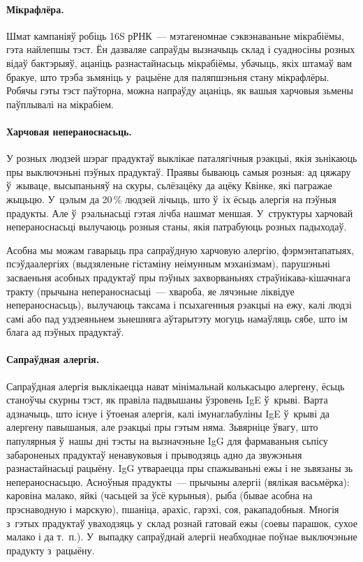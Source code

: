 \paragraph{Мікрафлёра.}
Шмат кампаніяў робіць 16S рРНК~--- мэтагеномнае сэквэнаваньне мікрабіёмы, гэта найлепшы тэст. Ён дазваляе сапраўды вызначыць склад і суадносіны розных відаў бактэрыяў, ацаніць разнастайнасьць мікрабіёмы, убачыць, якіх штамаў вам бракуе, што трэба зьмяніць у~рацыёне для паляпшэньня стану мікрафлёры. Робячы гэты тэст паўторна, можна напраўду ацаніць, як вашыя харчовыя зьмены паўплывалі на мікрабіем.

\paragraph{Харчовая непераноснасьць.}
У розных людзей шэраг прадуктаў выклікае паталягічныя рэакцыі, якія зьнікаюць пры выключэньні пэўных прадуктаў. Праявы бываюць самыя розныя: ад цяжару ў~жываце, высыпаньняў на скуры, сьлёзацёку да ацёку Квінке, які пагражае жыцьцю. У~цэлым да 20\,\% людзей лічыць, што ў~іх ёсьць алергія на пэўныя прадукты. Але ў~рэальнасьці гэтая лічба нашмат меншая. У~структуры харчовай непераноснасьці вылучаюць розныя станы, якія патрабуюць розных падыходаў.

Асобна мы можам гаварыць пра сапраўдную харчовую алергію, фэрмэнтапатыях, псэўдаалергіях (выдзяленьне гістаміну неімунным мэханізмам), парушэньні засваеньня асобных прадуктаў пры пэўных захворваньнях страўнікава-кішачнага тракту (прычына непераноснасьці~--- хвароба, яе лячэньне ліквідуе непераноснасьць), вылучаюць таксама і псыхагенныя рэакцыі на ежу, калі людзі самі або пад уздзеяньнем зьнешняга аўтарытэту могуць намаўляць сябе, што ім блага ад пэўных прадуктаў.

\paragraph{Сапраўдная алергія.}
Сапраўдная алергія выклікаецца нават мінімальнай колькасьцю алергену, ёсьць станоўчы скурны тэст, як правіла падвышаны ўзровень IgE ў~крыві. Варта адзначыць, што існуе і ўтоеная алергія, калі імунаглабуліны IgE ў~крыві да алергену павышаныя, але рэакцыі пры гэтым няма. Зьвярніце ўвагу, што папулярныя ў~нашы дні тэсты на вызначэньне IgG для фармаваньня сьпісу забароненых прадуктаў ненавуковыя і прыводзяць адно да звужэньня разнастайнасьці рацыёну. IgG утвараецца пры спажываньні ежы і не зьвязаны зь непераноснасьцю. Асноўныя прадукты~--- прычыны алергіі (вялікая васьмёрка): каровіна малако, яйкі (часьцей за ўсё курыныя), рыба (бывае асобна на прэснаводную і марскую), пшаніца, арахіс, гарэхі, соя, ракападобныя. Многія з~гэтых прадуктаў уваходзяць у~склад рознай гатовай ежы (соевы парашок, сухое малако і да т.~п.). У~выпадку сапраўднай алергіі неабходнае поўнае выключэньне прадукту з~рацыёну.

